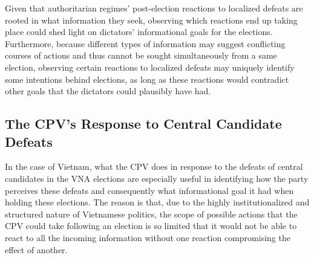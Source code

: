 \documentclass[12pt]{article}
\newcommand{\1}{\mathbbm{1}}
\begin{document}
Given that authoritarian regimes' post-election reactions to localized defeats are rooted in what information they seek, observing which reactions end up taking place could shed light on dictators' informational goals for the elections. Furthermore, because different types of information may suggest conflicting courses of actions and thus cannot be sought simultaneously from a same election, observing certain reactions to localized defeats may uniquely identify some intentions behind elections, as long as these reactions would contradict other goals that the dictators could plausibly have had.



\subsection{The CPV's Response to Central Candidate Defeats}
\label{sec:vietnam_local_defeat}

In the case of Vietnam, what the CPV does in response to the defeats of central candidates in the VNA elections are especially useful in identifying how the party perceives these defeats and consequently what informational goal it had when holding these elections. The reason is that, due to the highly institutionalized and structured nature of Vietnamese politics, the scope of possible actions that the CPV could take following an election is so limited that it would not be able to react to all the incoming information without one reaction compromising the effect of another.
\end{document}
